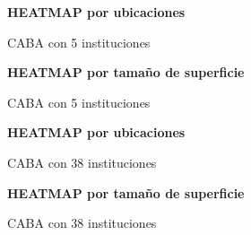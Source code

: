 \documentclass[a4paper, 10pt]{article}
\begin{document}
				\begin{figure}
    				\centering
    				\textbf{HEATMAP por ubicaciones}\par\medskip
    				\caption{CABA con 5 instituciones}
				\end{figure}				
				\begin{figure}
    				\centering
    				\textbf{HEATMAP por tamaño de superficie}\par\medskip
    				\caption{CABA con 5 instituciones}
				\end{figure}				
				\begin{figure}
    				\centering
    				\textbf{HEATMAP por ubicaciones}\par\medskip
    				\caption{CABA con 38 instituciones}
				\end{figure}				
				\begin{figure}
    				\centering
    				\textbf{HEATMAP por tamaño de superficie}\par\medskip
    				\caption{CABA con 38 instituciones}
				\end{figure}				
				\FloatBarrier
				
\end{document}
